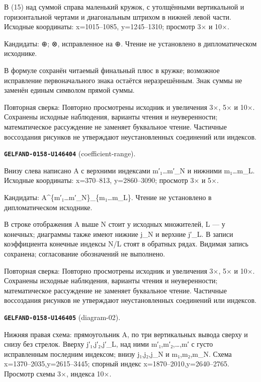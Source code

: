 В (15) над суммой справа маленький кружок, с утолщёнными вертикальной и горизонтальной чертами и диагональным штрихом в нижней левой части. Исходные координаты: x=1015–1085, y=1245–1310; просмотр 3× и 10×.\par
Кандидаты: ⊕; ⊗, исправленное на ⊕. Чтение не установлено в дипломатическом исходнике.\par
В формуле сохранён читаемый финальный плюс в кружке; возможное исправление первоначального знака остаётся неразрешённым. Знак суммы не заменён единым символом прямой суммы.\par
Повторная сверка: Повторно просмотрены исходник и увеличения 3×, 5× и 10×. Сохранены исходные наблюдения, варианты чтения и неуверенности; математическое рассуждение не заменяет буквальное чтение. Частичные воссоздания рисунков не утверждают неустановленных соединений или индексов.\par\medskip
\par\noindent\leavevmode{}\label{GELFAND-0158-U146404}\label{GELFAND-P001464:coefficient-range}\textbf{\texttt{GELFAND-0158-U146404}} (coefficient-range).\nopagebreak[4]\par
Внизу слева написано A с верхними индексами m′₁…m′\_N и нижними m₁…m\_L. Исходные координаты: x=370–813, y=2860–3090; просмотр 3× и 5×.\par
Кандидаты: A\textasciicircum{}\{m′₁…m′\_N\}\_\{m₁…m\_L\}. Чтение не установлено в дипломатическом исходнике.\par
В строке отображения A выше N стоит у исходных множителей, L — у конечных; диаграммы также имеют нижние j\_N и верхние j′\_L. В записи коэффициента конечные индексы N/L стоят в обратных рядах. Видимая запись сохранена; согласование обозначений не выполнено.\par
Повторная сверка: Повторно просмотрены исходник и увеличения 3×, 5× и 10×. Сохранены исходные наблюдения, варианты чтения и неуверенности; математическое рассуждение не заменяет буквальное чтение. Частичные воссоздания рисунков не утверждают неустановленных соединений или индексов.\par\medskip
\par\noindent\leavevmode{}\label{GELFAND-0158-U146405}\label{GELFAND-P001464:diagram-02}\textbf{\texttt{GELFAND-0158-U146405}} (diagram-02).\nopagebreak[4]\par
Нижняя правая схема: прямоугольник A, по три вертикальных вывода сверху и снизу без стрелок. Вверху j′₁,j′₂,j′\_L, над ними m′₁,m′₂,…,m′ с густо исправленным последним индексом; внизу j₁,j₂,j\_N и m₁,m₂,m\_N. Схема x=1370–2035,y=2615–3445; спорный индекс x=1870–2010,y=2640–2765. Просмотр схемы 3×, индекса 10×.\par
